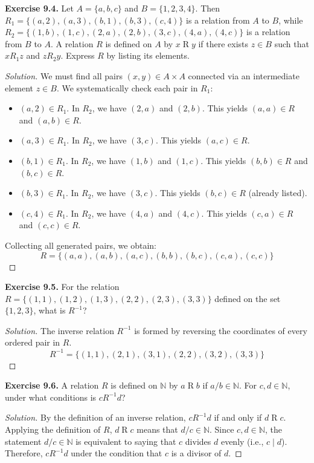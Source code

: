 \documentclass[11pt, a4paper]{article}
\theoremstyle{definition}
\theoremstyle{remark}
\newcommand{\N}{\mathbb{N}}
\begin{document}
\vspace{1em}
\textbf{Exercise 9.4.} Let $A = \{a, b, c\}$ and $B = \{1, 2, 3, 4\}$. Then $R_1 = \{(a, 2), (a, 3), (b, 1), (b, 3), (c, 4)\}$ is a relation from $A$ to $B$, while $R_2 = \{(1, b), (1, c), (2, a), (2, b), (3, c), (4, a), (4, c)\}$ is a relation from $B$ to $A$. A relation $R$ is defined on $A$ by $x \mathrel{R} y$ if there exists $z \in B$ such that $x \mathrel{R_1} z$ and $z \mathrel{R_2} y$. Express $R$ by listing its elements.
\begin{proof}[Solution]
We must find all pairs $(x, y) \in A \times A$ connected via an intermediate element $z \in B$. We systematically check each pair in $R_1$:
\begin{itemize}
    \item $(a, 2) \in R_1$. In $R_2$, we have $(2, a)$ and $(2, b)$. This yields $(a, a) \in R$ and $(a, b) \in R$.
    \item $(a, 3) \in R_1$. In $R_2$, we have $(3, c)$. This yields $(a, c) \in R$.
    \item $(b, 1) \in R_1$. In $R_2$, we have $(1, b)$ and $(1, c)$. This yields $(b, b) \in R$ and $(b, c) \in R$.
    \item $(b, 3) \in R_1$. In $R_2$, we have $(3, c)$. This yields $(b, c) \in R$ (already listed).
    \item $(c, 4) \in R_1$. In $R_2$, we have $(4, a)$ and $(4, c)$. This yields $(c, a) \in R$ and $(c, c) \in R$.
\end{itemize}
Collecting all generated pairs, we obtain:
\[ R = \{ (a, a), (a, b), (a, c), (b, b), (b, c), (c, a), (c, c) \} \]
\end{proof}

\vspace{1em}
\textbf{Exercise 9.5.} For the relation $R = \{(1, 1), (1, 2), (1, 3), (2, 2), (2, 3), (3, 3)\}$ defined on the set $\{1, 2, 3\}$, what is $R^{-1}$?
\begin{proof}[Solution]
The inverse relation $R^{-1}$ is formed by reversing the coordinates of every ordered pair in $R$.
\[ R^{-1} = \{ (1, 1), (2, 1), (3, 1), (2, 2), (3, 2), (3, 3) \} \]
\end{proof}

\vspace{1em}
\textbf{Exercise 9.6.} A relation $R$ is defined on $\N$ by $a \mathrel{R} b$ if $a/b \in \N$. For $c, d \in \N$, under what conditions is $c \mathrel{R^{-1}} d$?
\begin{proof}[Solution]
By the definition of an inverse relation, $c \mathrel{R^{-1}} d$ if and only if $d \mathrel{R} c$. 
Applying the definition of $R$, $d \mathrel{R} c$ means that $d/c \in \N$. 
Since $c, d \in \N$, the statement $d/c \in \N$ is equivalent to saying that $c$ divides $d$ evenly (i.e., $c \mid d$). 
Therefore, $c \mathrel{R^{-1}} d$ under the condition that $c$ is a divisor of $d$.
\end{proof}
\end{document}
